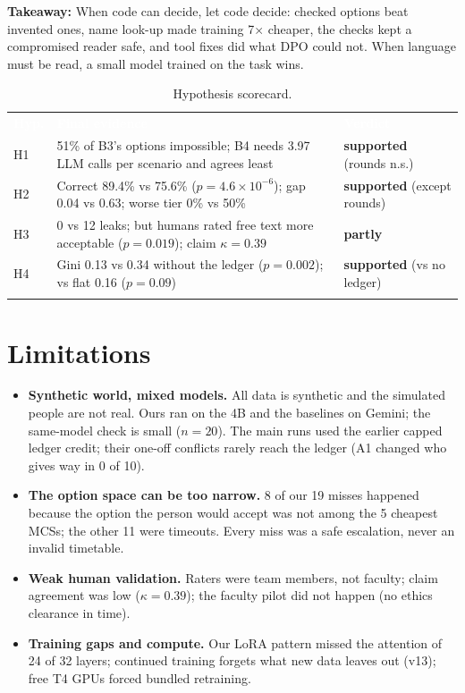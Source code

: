 \documentclass[10pt,a4paper]{article}
\newcommand{\hdr}{\rowcolor{secblue}}
\newcommand{\hd}[1]{\textcolor{white}{\textbf{#1}}}
\newcommand{\yes}{{\color{goodgreen}\textbf{supported}}}
\newcommand{\partly}{{\color{gaporange}\textbf{partly}}}
\newcommand{\tk}[1]{\textbf{Takeaway:} #1}
\begin{document}
\begin{takeaway}
\tk{When code can decide, let code decide: checked options beat invented ones, name look-up
made training 7$\times$ cheaper, the checks kept a compromised reader safe, and tool fixes did what
DPO could not. When language must be read, a small model trained on the task wins.}
\end{takeaway}

\begin{table}[H]
\centering\small
{}\begin{tabularx}{\textwidth}{l Y l}
\toprule{}
\hdr \hd{Hyp.} & \hd{Final evidence} & \hd{Verdict}\\
\midrule{}
H1 & 51\% of B3's options impossible; B4 needs 3.97 LLM calls per scenario and agrees least & \yes{} (rounds n.s.)\\
H2 & Correct 89.4\% vs 75.6\% ($p{=}4.6{\times}10^{-6}$); gap 0.04 vs 0.63; worse tier 0\% vs 50\% & \yes{} (except rounds)\\
H3 & 0 vs 12 leaks; but humans rated free text more acceptable ($p{=}0.019$); claim $\kappa{=}0.39$ & \partly{}\\
H4 & Gini 0.13 vs 0.34 without the ledger ($p{=}0.002$); vs flat 0.16 ($p{=}0.09$) & \yes{} (vs no ledger)\\
\bottomrule{}
\end{tabularx}
\caption{Hypothesis scorecard.}
\end{table}

\section{Limitations}
\begin{itemize}
\item \textbf{Synthetic world, mixed models.} All data is synthetic and the simulated people are
not real. Ours ran on the 4B and the baselines on Gemini; the same-model check is small ($n{=}20$). The main runs used the earlier capped ledger credit; their
one-off conflicts rarely reach the ledger (A1 changed who gives way in 0 of 10).
\item \textbf{The option space can be too narrow.} 8 of our 19 misses happened because the option
the person would accept was not among the 5 cheapest MCSs; the other 11 were timeouts. Every
miss was a safe escalation, never an invalid timetable.
\item \textbf{Weak human validation.} Raters were team members, not faculty; claim agreement was
low ($\kappa{=}0.39$); the faculty pilot did not happen (no ethics clearance in time).
\item \textbf{Training gaps and compute.} Our LoRA pattern missed the attention of 24 of 32 layers;
continued training forgets what new data leaves out (v13); free T4 GPUs forced bundled retraining.
\end{itemize}
\end{document}
